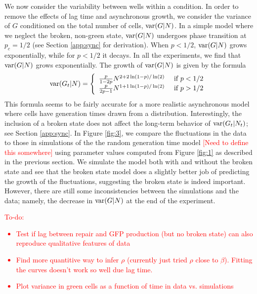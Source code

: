 \documentclass{article}
\begin{document}
We now consider the variability between wells within a condition. In order to remove the effects of lag time and asynchronous  growth, we consider the variance  of $G$ conditioned on the total number of cells, ${\rm var}(G|N)$. In a simple model where we neglect the broken, non-green state, ${\rm var}(G|N)$ undergoes phase transition at $p_c = 1/2$ (see Section \ref{app:sync} for derivation). When $p<1/2$, ${\rm var}(G|N)$ grows exponentially, while for $p<1/2$ it decays. In all the experiments, we find that ${\rm var}(G|N)$ grows exponentially. The growth of ${\rm var}(G|N)$ is given by the formula 
\begin{equation}
{\rm var}(G_t|N) = \left\{\begin{array}{cc} 
\frac{p}{1-2p} N^{2 + 2 \ln(1-p)/\ln(2)}& \text{ if } p<1/2\\
\frac{p}{2p-1} N^{1+ 1 \ln(1-p)/\ln(2)}& \text{ if } p>1/2
\end{array}\right.
\end{equation}
This formula seems to be fairly accurate for a more realistic asynchronous model where cells have generation times drawn from a distribution.  Interestingly, the inclusion of a broken state does not affect the long-term behavior of ${\rm var}(G_t|N_t)$; see Section \ref{app:sync}. In Figure \ref{fig:3}, we compare the fluctuations in the data to those in simulations of the the random generation time model  \textcolor{red}{[Need to define this somewhere]} using parameter values computed from Figure \ref{fig:1} as described in the previous section. We simulate the model both with and without the broken state and see that the broken state model does a slightly better job of predicting the growth of the fluctuations, suggesting the broken state is indeed important. However, there are still some inconsistencies between the simulations and the data; namely, the decrease in ${\rm var}(G|N)$ at the end of the experiment.  


\textcolor{red}{To-do: 
\begin{itemize}
\item Test if lag between repair and GFP production (but no broken state) can also reproduce qualitative features of data
\item Find more quantitive way to infer $\rho$ (currently just tried $\rho$ close to $\beta$). Fitting the curves doesn't work so well due lag time. 
\item Plot variance in green cells as a function of time in data vs. simulations
\end{itemize}
}
\end{document}
